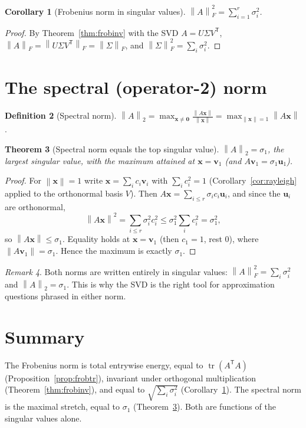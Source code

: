 \documentclass[11pt,oneside]{book}
\theoremstyle{plain}
\newtheorem{theorem}{Theorem}[chapter]
\newtheorem{corollary}[theorem]{Corollary}
\theoremstyle{definition}
\newtheorem{definition}[theorem]{Definition}
\theoremstyle{remark}
\newtheorem{remark}[theorem]{Remark}
\newcommand{\tr}{\operatorname{tr}}
\newcommand{\norm}[1]{\left\lVert #1 \right\rVert}
\newcommand{\fn}[1]{\norm{#1}_F}
\newcommand{\sn}[1]{\norm{#1}_2}
\newcommand{\T}{^{\mathsf T}}
\newcommand{\bu}{\mathbf{u}}
\newcommand{\bv}{\mathbf{v}}
\newcommand{\bx}{\mathbf{x}}
\newcommand{\bzero}{\mathbf{0}}
\begin{document}
\begin{corollary}[Frobenius norm in singular values]\label{cor:frobsing}
$\displaystyle \fn{A}^2=\sum_{i=1}^r\sigma_i^2$.
\end{corollary}
\begin{proof}
By Theorem~\ref{thm:frobinv} with the SVD $A=U\Sigma V\T$,
$\fn{A}=\fn{U\Sigma V\T}=\fn{\Sigma}$, and $\fn{\Sigma}^2=\sum_i\sigma_i^2$.
\end{proof}

\section{The spectral (operator-2) norm}

\begin{definition}[Spectral norm]
$\displaystyle \sn{A}=\max_{\bx\ne\bzero}\frac{\norm{A\bx}}{\norm{\bx}}
=\max_{\norm{\bx}=1}\norm{A\bx}$.
\end{definition}

\begin{theorem}[Spectral norm equals the top singular value]\label{thm:specnorm}
$\sn{A}=\sigma_1$, the largest singular value, with the maximum attained at
$\bx=\bv_1$ (and $A\bv_1=\sigma_1\bu_1$).
\end{theorem}
\begin{proof}
For $\norm{\bx}=1$ write $\bx=\sum_i c_i\bv_i$ with $\sum_i c_i^2=1$
(Corollary~\ref{cor:rayleigh} applied to the orthonormal basis $V$). Then
$A\bx=\sum_{i\le r}\sigma_i c_i\bu_i$, and since the $\bu_i$ are orthonormal,
\[
\norm{A\bx}^2=\sum_{i\le r}\sigma_i^2 c_i^2\le\sigma_1^2\sum_i c_i^2=\sigma_1^2 ,
\]
so $\norm{A\bx}\le\sigma_1$. Equality holds at $\bx=\bv_1$ (then $c_1=1$, rest $0$),
where $\norm{A\bv_1}=\sigma_1$. Hence the maximum is exactly $\sigma_1$.
\end{proof}

\begin{remark}
Both norms are written entirely in singular values:
$\fn{A}^2=\sum_i\sigma_i^2$ and $\sn{A}=\sigma_1$. This is why the SVD is the right tool
for approximation questions phrased in either norm.
\end{remark}

\section*{Summary}
The Frobenius norm is total entrywise energy, equal to $\tr(A\T A)$
(Proposition~\ref{prop:frobtr}), invariant under orthogonal multiplication
(Theorem~\ref{thm:frobinv}), and equal to $\sqrt{\sum_i\sigma_i^2}$
(Corollary~\ref{cor:frobsing}). The spectral norm is the maximal stretch, equal to
$\sigma_1$ (Theorem~\ref{thm:specnorm}). Both are functions of the singular values
alone.
\end{document}
